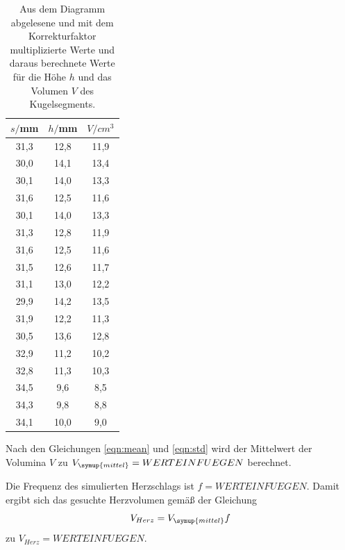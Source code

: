\begin{table}[htp]
	\begin{center}
    \label{tab:herz}
    \caption{Aus dem Diagramm abgelesene und mit dem Korrekturfaktor multiplizierte Werte und
    daraus berechnete Werte für die Höhe $h$ und das Volumen $V$ des Kugelsegments.}
		\begin{tabular}{ccc}
		\toprule
			{$s/$mm} & {$h/$mm} & {$V/cm^3$}\\
			\midrule
			31,3 & 12,8 & 11,9\\
			30,0 & 14,1 & 13,4\\
			30,1 & 14,0 & 13,3\\
			31,6 & 12,5 & 11,6\\
			30,1 & 14,0 & 13,3\\
			31,3 & 12,8 & 11,9\\
			31,6 & 12,5 & 11,6\\
			31,5 & 12,6 & 11,7\\
			31,1 & 13,0 & 12,2\\
			29,9 & 14,2 & 13,5\\
			31,9 & 12,2 & 11,3\\
			30,5 & 13,6 & 12,8\\
			32,9 & 11,2 & 10,2\\
			32,8 & 11,3 & 10,3\\
			34,5 & 9,6 & 8,5\\
			34,3 & 9,8 & 8,8\\
			34,1 & 10,0 & 9,0\\
		\bottomrule
		\end{tabular}
	\end{center}
\end{table}

Nach den Gleichungen \eqref{eqn:mean} und \eqref{eqn:std} wird der Mittelwert
der Volumina $V$ zu $V_{\symup{mittel}}=WERTEINFUEGEN$ berechnet.

Die Frequenz des simulierten Herzschlags ist $f=WERTEINFUEGEN$. Damit ergibt sich
das gesuchte Herzvolumen gemäß der Gleichung
\begin{equation}
  V_{Herz} = V_{\symup{mittel}} f
\end{equation}
zu $V_{Herz}=WERTEINFUEGEN$.
